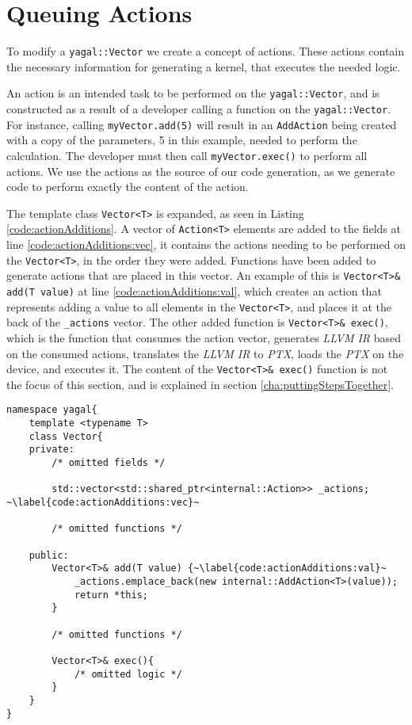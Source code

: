 \section{Queuing Actions} \label{cha:queueingActions}
To modify a \texttt{yagal::Vector} we create a concept of actions. These actions contain the necessary information for generating a kernel, that executes the needed logic.

An action is an intended task to be performed on the \texttt{yagal::Vector}, and is constructed as a result of a developer calling a function on the \texttt{yagal::Vector}. For instance, calling \texttt{myVector.add(5)} will result in an \texttt{AddAction} being created with a copy of the parameters, 5 in this example, needed to perform the calculation. The developer must then call \texttt{myVector.exec()} to perform all actions. We use the actions as the source of our code generation, as we generate code to perform exactly the content of the action.

The template class \texttt{Vector<T>} is expanded, as seen in Listing \ref{code:actionAdditions}. A vector of \texttt{Action<T>} elements are added to the fields at line \ref{code:actionAdditions:vec}, it contains the actions needing to be performed on the \texttt{Vector<T>}, in the order they were added. Functions have been added to generate actions that are placed in this vector. An example of this is \texttt{Vector<T>\& add(T value)} at line \ref{code:actionAdditions:val}, which creates an action that represents adding a value to all elements in the \texttt{Vector<T>}, and places it at the back of the \texttt{\_actions} vector. The other added function is \texttt{Vector<T>\& exec()}, which is the function that consumes the action vector, generates \textit{LLVM IR} based on the consumed actions, translates the \textit{LLVM IR} to \textit{PTX}, loads the \textit{PTX} on the device, and executes it. The content of the \texttt{Vector<T>\& exec()} function is not the focus of this section, and is explained in section \ref{cha:puttingStepsTogether}.

\begin{lstlisting}[caption={Vector<T> action additions.}, label={code:actionAdditions}]
namespace yagal{
    template <typename T>
    class Vector{
    private:
        /* omitted fields */

        std::vector<std::shared_ptr<internal::Action>> _actions; ~\label{code:actionAdditions:vec}~

        /* omitted functions */
    
    public:
        Vector<T>& add(T value) {~\label{code:actionAdditions:val}~
            _actions.emplace_back(new internal::AddAction<T>(value));
            return *this;
        }
        
        /* omitted functions */

        Vector<T>& exec(){
            /* omitted logic */
        }
    }
}
\end{lstlisting}

